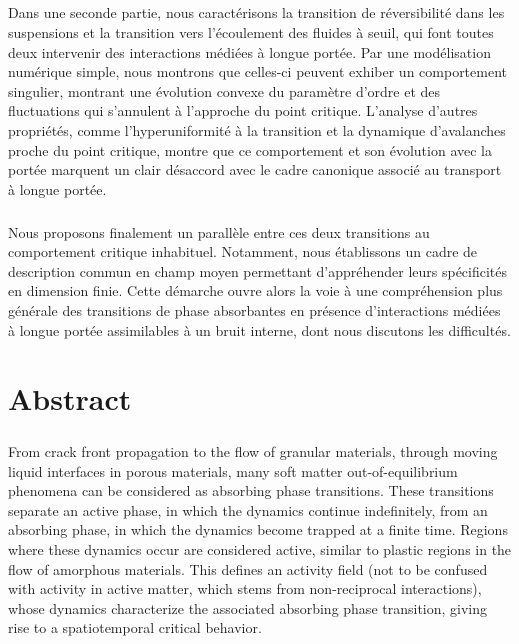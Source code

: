 \subparagraph{}Dans une seconde partie, nous caractérisons la transition de réversibilité dans les suspensions et la transition vers l’écoulement des fluides à seuil, qui font toutes deux intervenir des interactions médiées à longue portée.  Par une modélisation numérique simple, nous montrons que celles-ci peuvent exhiber un comportement singulier, montrant une évolution convexe du paramètre d'ordre et des fluctuations qui s'annulent à l'approche du point critique. L'analyse d'autres propriétés, comme l'hyperuniformité à la transition et la dynamique d'avalanches proche du point critique, montre que ce comportement et son évolution avec la portée marquent un clair désaccord avec le cadre canonique associé au transport à longue portée. 

\subparagraph{}Nous proposons finalement un parallèle entre ces deux transitions au comportement critique inhabituel. Notamment, nous établissons un cadre de description commun en champ moyen permettant d'appréhender leurs spécificités en dimension finie. Cette démarche ouvre alors la voie à une compréhension plus générale des transitions de phase absorbantes en présence d'interactions médiées à longue portée assimilables à un bruit interne, dont nous discutons les difficultés.

\section*{Abstract}

\subparagraph{}From crack front propagation to the flow of granular materials, through moving liquid interfaces in porous materials, many soft matter out-of-equilibrium phenomena can be considered as absorbing phase transitions. These transitions separate an active phase, in which the dynamics continue indefinitely, from an absorbing phase, in which the dynamics become trapped at a finite time. Regions where these dynamics occur are considered active, similar to plastic regions in the flow of amorphous materials. This defines an activity field (not to be confused with activity in active matter, which stems from non-reciprocal interactions), whose dynamics characterize the associated absorbing phase transition, giving rise to a spatiotemporal critical behavior.

